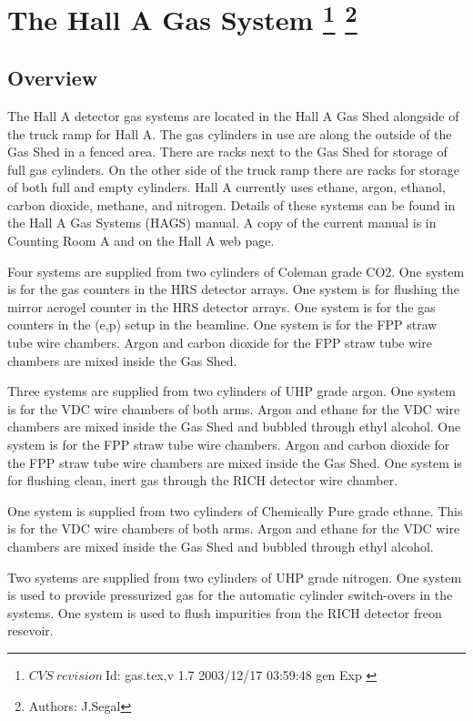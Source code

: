 \chapter[The Hall A Gas System]{The Hall A Gas System
\footnote{
  $CVS~revision~ $Id: gas.tex,v 1.7 2003/12/17 03:59:48 gen Exp $ $
}
\footnote{Authors: J.Segal }
}

\section{Overview}
The Hall A detector gas systems are located in the Hall A Gas Shed
alongside of the truck ramp for Hall A.  The gas cylinders in use
are along the outside of the Gas Shed in a fenced area.
There are racks next to
the Gas Shed for storage of full gas cylinders.  On the other side of the
truck ramp there are racks for storage of both full and empty cylinders.
Hall A currently uses ethane, argon, ethanol, carbon dioxide, methane, 
and nitrogen.
Details of these systems can be found in the Hall A Gas Systems (HAGS) manual.
A copy of the current manual is in Counting Room A and on the Hall A web page.

Four systems are supplied from two cylinders of Coleman grade CO2.
One system is for the gas \Cherenkov{} counters in the HRS detector arrays.
One system is for
flushing the mirror aerogel \Cherenkov{} counter in the HRS detector arrays.
One system is for
the gas \Cherenkov{} counters in the (e,p) setup in the beamline.
One system is for the FPP straw tube wire chambers.
Argon and carbon dioxide for the FPP straw tube wire chambers
are mixed inside the Gas Shed.

Three systems are supplied from two cylinders of UHP grade argon.
One system is for the VDC wire chambers
of both arms.  Argon and ethane for the VDC wire chambers are
mixed inside the Gas Shed and bubbled
through ethyl alcohol.
One system is for the FPP straw tube wire chambers.
Argon and carbon dioxide for the FPP straw tube wire chambers
are mixed inside the Gas Shed.
One system is for flushing clean, inert gas through the RICH detector
wire chamber.

One system is supplied from two cylinders 
of Chemically Pure grade ethane.  This is for the VDC wire chambers
of both arms.  Argon and ethane for the VDC wire chambers
are mixed inside the Gas Shed and bubbled
through ethyl alcohol.

Two systems are supplied from two cylinders of UHP grade nitrogen.
One system is used to provide pressurized
gas for the automatic cylinder switch-overs in the systems.
One system is used to flush impurities from the RICH detector
freon resevoir.

